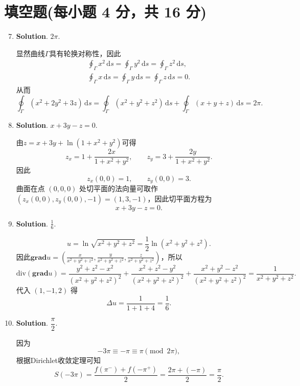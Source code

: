 \documentclass[../main.tex]{subfiles}
\begin{document}
\section{填空题(每小题 4 分，共 16 分)}
\begin{enumerate}
  \setcounter{enumi}{6}
  \item \textbf{Solution}. $2\pi$.

        显然曲线$\Gamma$具有轮换对称性，因此
        \[
          \begin{gathered}
            \oint_\Gamma x^2\,\mathrm{d}s=\oint_\Gamma y^2\,\mathrm{d}s=\oint_\Gamma z^2\,\mathrm{d}s,\\
            \oint_\Gamma x\,\mathrm{d}s=\oint_\Gamma y\,\mathrm{d}s=\oint_\Gamma z\,\mathrm{d}s=0.
          \end{gathered}
        \]
        从而
        \[
          \oint_\Gamma(x^2+2y^2+3z)\,\mathrm{d}s=\oint_\Gamma(x^2+y^2+z^2)\,\mathrm{d}s+\oint_\Gamma(x+y+z)\,\mathrm{d}s=2\pi.
        \]

  \item \textbf{Solution}. $x+3y-z=0$.

        由$z=x+3y+\ln(1+x^2+y^2)$可得
        \[
          z_x=1+\frac{2x}{1+x^2+y^2},\qquad z_y=3+\frac{2y}{1+x^2+y^2}.
        \]
        因此
        \[
          z_x(0,0)=1,\qquad z_y(0,0)=3.
        \]
        曲面在点 \((0,0,0)\) 处切平面的法向量可取作$(z_x(0,0),z_y(0,0),-1)=(1,3,-1)$，因此切平面方程为
        \[
          x+3y-z=0.
        \]

  \item \textbf{Solution}. $\frac{1}{6}$.

        \[
          u=\ln\sqrt{x^2+y^2+z^2}=\frac12\ln(x^2+y^2+z^2).
        \]
        因此$\mathbf{grad}u=\left(\frac{x}{x^2+y^2+z^2},\frac{y}{x^2+y^2+z^2},\frac{z}{x^2+y^2+z^2}\right)$，所以
        \[
          \text{div}(\mathbf{grad}u)=\frac{y^2+z^2-x^2}{(x^2+y^2+z^2)^2}+\frac{x^2+z^2-y^2}{(x^2+y^2+z^2)^2}+\frac{x^2+y^2-z^2}{(x^2+y^2+z^2)^2}=\frac{1}{x^2+y^2+z^2}.
        \]
        代入 \((1,-1,2)\) 得
        \[
          \Delta u=\frac{1}{1+1+4}=\frac{1}{6}.
        \]

  \item \textbf{Solution}. $\dfrac{\pi}{2}$.

        因为
        \[
          -3\pi\equiv -\pi\equiv \pi \pmod{2\pi},
        \]
        根据Dirichlet收敛定理可知
        \[
          S(-3\pi)=\frac{f(\pi^-)+f(-\pi^+)}{2}
          =\frac{2\pi+(-\pi)}{2}
          =\frac{\pi}{2}.
        \]

\end{enumerate}
\end{document}
